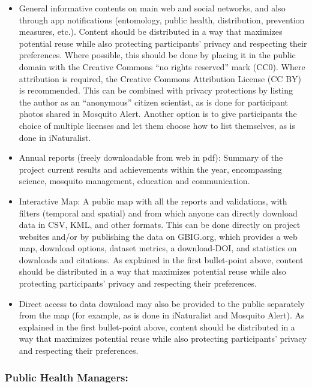 \documentclass[]{article}
\providecommand{\tightlist}{%
  \setlength{\itemsep}{0pt}\setlength{\parskip}{0pt}}
\begin{document}
\begin{itemize}
\tightlist
\item
  General informative contents on main web and social networks, and also through app notifications (entomology, public health, distribution, prevention measures, etc.). Content should be distributed in a way that maximizes potential reuse while also protecting participants' privacy and respecting their preferences. Where possible, this should be done by placing it in the public domain with the Creative Commons ``no rights reserved'' mark (CC0). Where attribution is required, the Creative Commons Attribution License (CC BY) is recommended. This can be combined with privacy protections by listing the author as an ``anonymous'' citizen scientist, as is done for participant photos shared in Mosquito Alert. Another option is to give participants the choice of multiple licenses and let them choose how to list themselves, as is done in iNaturalist.
\item
  Annual reports (freely downloadable from web in pdf): Summary of the project current results and achievements within the year, encompassing science, mosquito management, education and communication.
\item
  Interactive Map: A public map with all the reports and validations, with filters (temporal and spatial) and from which anyone can directly download data in CSV, KML, and other formats. This can be done directly on project websites and/or by publishing the data on GBIG.org, which provides a web map, download options, dataset metrics, a download-DOI, and statistics on downloads and citations. As explained in the first bullet-point above, content should be distributed in a way that maximizes potential reuse while also protecting participants' privacy and respecting their preferences.
\item
  Direct access to data download may also be provided to the public separately from the map (for example, as is done in iNaturalist and Mosquito Alert). As explained in the first bullet-point above, content should be distributed in a way that maximizes potential reuse while also protecting participants' privacy and respecting their preferences.
\end{itemize}

\hypertarget{public-health-managers}{%
\subsubsection{Public Health Managers:}\label{public-health-managers}}
\end{document}
